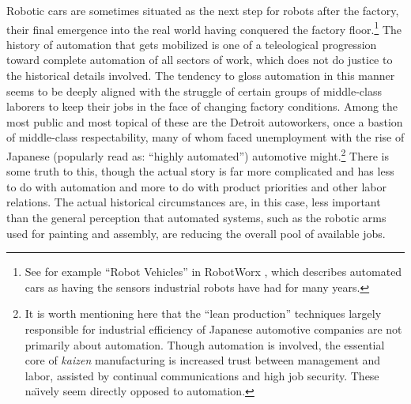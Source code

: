 Robotic cars are sometimes situated as
the next step for robots after the factory, their final emergence into
the real world having conquered the factory floor.\footnote{See for
  example ``Robot Vehicles'' in RobotWorx \cite{robotworx}, which describes automated cars as having the sensors
  industrial robots have had for many years.} The history of
automation that gets mobilized is one of a teleological progression
toward complete automation of all sectors of work, which does not do
justice to the historical details involved. The tendency to gloss
automation in this manner seems
to be deeply aligned with the struggle of certain groups of
middle-class laborers to keep their jobs in the face of changing
factory conditions. Among the most public and most topical of these
are the Detroit autoworkers, once a bastion of middle-class
respectability, many of whom faced unemployment with the rise of
Japanese (popularly read as: ``highly automated'') automotive
might.\footnote{It is worth mentioning here that the ``lean
  production'' techniques largely responsible for industrial
  efficiency of Japanese automotive companies are not primarily about
  automation. Though automation is involved, the essential core of
  \emph{kaizen} manufacturing is increased trust between management
  and labor, assisted by continual communications and high job
  security.\cite[p. 198--199]{nyeAmericas} These na\"{\i}vely seem
  directly opposed to automation.} There is some truth to this, though the actual story
is far more complicated and has less to do with automation and more to
do with product priorities and other labor
relations.\cite[p. 188--200]{nyeAmericas} The actual historical
circumstances are, in this case, less important than the general perception that automated
systems, such as the robotic arms used for painting and assembly, are
reducing the overall pool of available jobs.

